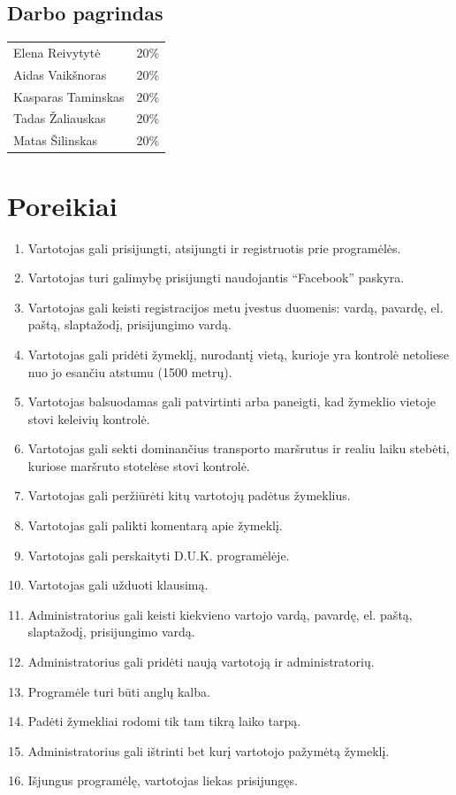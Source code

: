 \documentclass{VUMIFPSkursinis}
\begin{document}
\subsection{Darbo pagrindas}
\begin{tabular}{lr}
   Elena Reivytytė & 20\% \\
   Aidas Vaikšnoras & 20\% \\
   Kasparas Taminskas & 20\% \\
   Tadas Žaliauskas & 20\% \\
   Matas Šilinskas & 20\% \\
\end{tabular}

\section{Poreikiai}
\begin{enumerate}
	\item Vartotojas gali prisijungti, atsijungti ir registruotis prie programėlės.
	\item Vartotojas turi galimybę prisijungti naudojantis “Facebook” paskyra.
	\item Vartotojas gali keisti registracijos metu įvestus duomenis: vardą, pavardę, el. paštą, slaptažodį, prisijungimo vardą.
	\item Vartotojas gali pridėti žymeklį, nurodantį vietą, kurioje yra kontrolė netoliese nuo jo esančiu atstumu (1500 metrų).
	\item Vartotojas balsuodamas gali patvirtinti arba paneigti, kad žymeklio vietoje stovi keleivių kontrolė.
	\item Vartotojas gali sekti dominančius transporto maršrutus ir realiu laiku stebėti, kuriose maršruto stotelėse stovi kontrolė. 
	\item Vartotojas gali peržiūrėti kitų vartotojų padėtus žymeklius. 
	\item Vartotojas gali palikti komentarą apie žymeklį. 
	\item Vartotojas gali perskaityti D.U.K. programėlėje.
	\item Vartotojas gali užduoti klausimą.
	\item Administratorius gali keisti kiekvieno vartojo vardą, pavardę, el. paštą, slaptažodį, prisijungimo vardą.
	\item Administratorius gali pridėti naują vartotoją ir administratorių.
	\item Programėle turi būti anglų kalba. 
	\item Padėti žymekliai rodomi tik tam tikrą laiko tarpą.
	\item Administratorius gali ištrinti bet kurį vartotojo pažymėtą žymeklį.
	\item Išjungus programėlę, vartotojas liekas prisijungęs.
\end{enumerate} 
\end{document}
